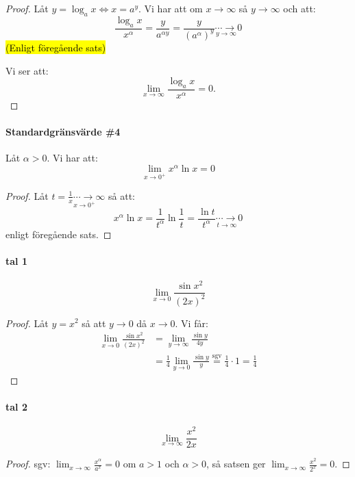 \begin{proof}
	Låt $y=\log_ax\iff x=a^y$. Vi har att om $x\to\infty$ så $y\to\infty$ och att:
	$$
		\frac{\log_ax}{x^\alpha}=\frac{y}{a^{\alpha y}}=\frac{y}{(a^\alpha)^y}\underset{y\to\infty}{\cdots\longrightarrow}0
	$$
	\hl{(Enligt föregående sats)}

	Vi ser att:
	$$
		\lim_{x\to\infty}\frac{\log_ax}{x^\alpha}=0.
	$$
\end{proof}

\paragraph{Standardgränsvärde \#4}
Låt $\alpha>0$. Vi har att:
$$
	\lim_{x\to0^+}x^\alpha\ln x=0
$$

\begin{proof}
	Låt $t=\frac{1}{x}\underset{x\to0^+}{\cdots\longrightarrow}\infty$ så att:
	$$
		x^\alpha\ln x=\frac{1}{t^\alpha}\ln\frac{1}{t}=\frac{\ln t}{t^\alpha}\underset{t\to\infty}{\cdots\longrightarrow}0
	$$
	enligt föregående sats.
\end{proof}

\begin{ber}
	\paragraph{tal 1}

	$$
		\lim_{x\to0}\frac{\sin x^2}{(2x)^2}
	$$
	\begin{proof}
		Låt $y=x^2$ så att $y\to0$ då $x\to0$. Vi får:
		\begin{align*}
			\lim_{x\to0}\frac{\sin x^2}{(2x)^2}
			&=\lim_{y\to\infty}\frac{\sin y}{4y}\\
			&=\frac{1}{4}\lim_{y\to0}\frac{\sin y}{y}\overset{\text{sgv}}{=}\frac{1}{4}\cdot1=\frac{1}{4}
		\end{align*}
	\end{proof}
\end{ber}

\begin{ber}
	\paragraph{tal 2}

	$$
		\lim_{x\to\infty}\frac{x^2}{2x}
	$$
	\begin{proof}
		sgv: $\lim_{x\to\infty}\frac{x^\alpha}{a^x}=0$ om $a>1$ och $\alpha>0$,
		så satsen ger $\lim_{x\to\infty}\frac{x^2}{2^x}=0$.
	\end{proof}
\end{ber}

